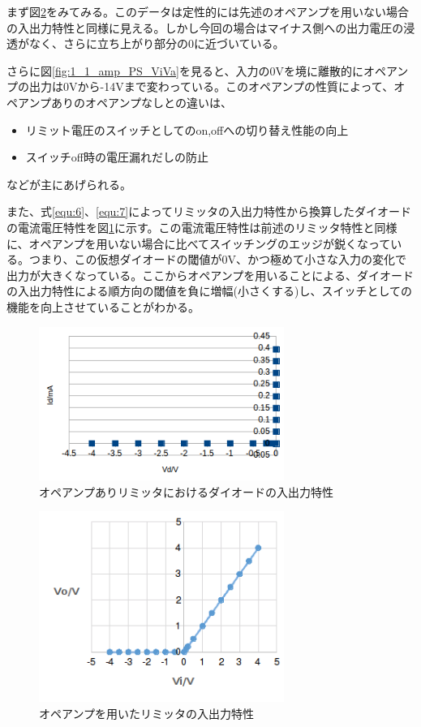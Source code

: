 \documentclass[11pt,a4j]{jsarticle}
\begin{document}
    まず図\ref{fig:1_1_amp_PS_ViVo}をみてみる。このデータは定性的には先述のオペアンプを用いない場合の入出力特性と同様に見える。しかし今回の場合はマイナス側への出力電圧の浸透がなく、さらに立ち上がり部分の0に近づいている。
    
    さらに図\ref{fig:1_1_amp_PS_ViVa}を見ると、入力の0Vを境に離散的にオペアンプの出力は0Vから-14Vまで変わっている。このオペアンプの性質によって、オペアンプありのオペアンプなしとの違いは、
    \begin{itemize}
    \item リミット電圧のスイッチとしてのon,offへの切り替え性能の向上
    \item スイッチoff時の電圧漏れだしの防止
    \end{itemize}
    などが主にあげられる。
    
    また、式\ref{equ:6}、\ref{equ:7}によってリミッタの入出力特性から換算したダイオードの電流電圧特性を図\ref{fig:b_amp}に示す。この電流電圧特性は前述のリミッタ特性と同様に、オペアンプを用いない場合に比べてスイッチングのエッジが鋭くなっている。つまり、この仮想ダイオードの閾値が0V、かつ極めて小さな入力の変化で出力が大きくなっている。ここからオペアンプを用いることによる、ダイオードの入出力特性による順方向の閾値を負に増幅(小さくする)し、スイッチとしての機能を向上させていることがわかる。
    
    \begin{figure}[htbp]
  \centering
  \includegraphics[width=8cm,clip]{b_amp.png}
  \caption{オペアンプありリミッタにおけるダイオードの入出力特性}
  \label{fig:b_amp}
 \end{figure}
    
    \begin{figure}[htbp]
  \centering
  \includegraphics[width=8cm,clip]{1_1_amp_PS_ViVo.png}
  \caption{オペアンプを用いたリミッタの入出力特性}
  \label{fig:1_1_amp_PS_ViVo}
 \end{figure}%
   
\end{document}
